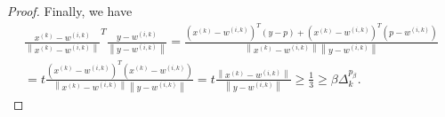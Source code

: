 \documentclass{article}
\newtheorem{lemma}[theorem]{Lemma}
\theoremstyle{case}
\numberwithin{theorem}{subsection}
\newcommand{\dk}{\Delta_k}
\newcommand{\reals}{\mathbb R}
\newcommand{\Rn}{\mathbb R^n}
\newcommand{\wik}{{w^{(i, k)}}}
\newcommand{\xk}{{x^{(k)}}}
\begin{document}
\begin{proof}
Finally, we have
\begin{align*}
\frac{\xk - \wik}{\left\|\xk - \wik\right\|}^T\frac{y - \wik}{\left\|y - \wik\right\|} 
= \frac{\left(\xk - \wik\right) ^T\left(y - p\right) + \left(\xk - \wik\right)^T\left(p - \wik\right)}{\left\|\xk - \wik\right\|\left\|y - \wik\right\|} \\
= t\frac{\left(\xk - \wik\right)^T\left(\xk - \wik\right)}{\left\|\xk - \wik\right\|\left\|y - \wik\right\|} = t \frac{\left\|\xk - \wik\right\|}{\left\|y - \wik\right\|}
\ge \frac 1 3 \ge \beta \dk^{p_{\beta}}.
\end{align*}
\end{proof}
% 
% 
% 
% 
\end{document}
